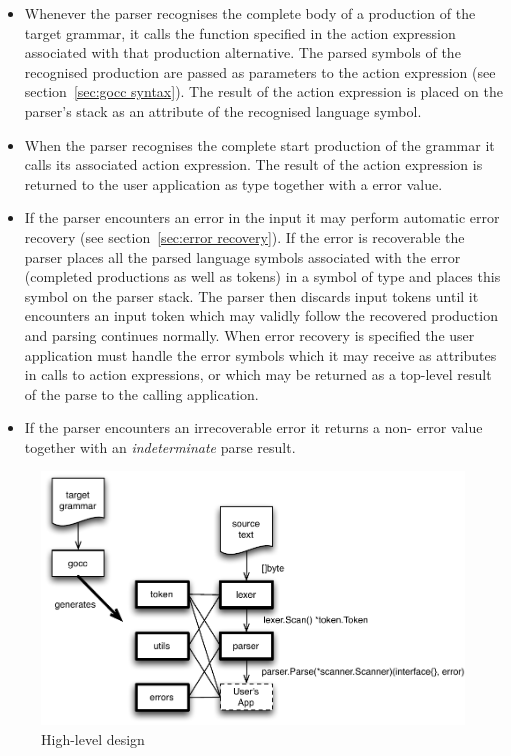 \documentclass[12pt]{article}
\begin{document}
\begin{itemize}
		\item Whenever the parser recognises the complete body of a production of the target grammar, it calls the function specified in the action expression associated with that production alternative. The parsed symbols of the recognised production are passed as parameters to the action expression (see section~\ref{sec:gocc syntax}). The result of the action expression is placed on the parser's stack as an attribute of the recognised language symbol.

		\item When the parser recognises the complete start production of the grammar it calls its associated action expression. The result of the action expression is returned to the user application as type  together with a  error value.

		\item If the parser encounters an error in the input it may perform automatic error recovery (see section~\ref{sec:error recovery}). If the error is recoverable the parser places all the parsed language symbols associated with the error (completed productions as well as tokens) in a symbol of type  and places this symbol on the parser stack. The parser then discards input tokens until it encounters an input token which may validly follow the recovered production and parsing continues normally. When error recovery is specified the user application must handle the error symbols which it may receive as attributes in calls to action expressions, or which may be returned as a top-level result of the parse to the calling application.

		\item If the parser encounters an irrecoverable error it returns a non- error value together with an {\em indeterminate} parse result.
	\end{itemize}

	\begin{figure}
		\includegraphics[scale=1]{"hl_design"}
		\caption{High-level design}
		\label{fig:hl design}
	\end{figure}
\end{document}
